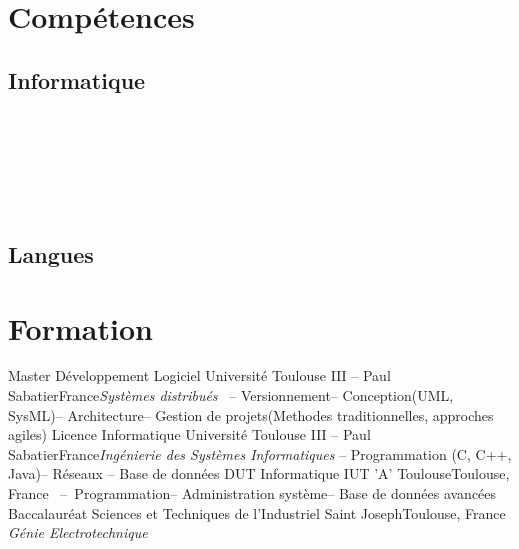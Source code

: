 \documentclass{my_cv_bis}
\begin{document}
		\section{Compétences}
			\subsection{Informatique}
			\\
			\\
			\\
			\\
			\\

		\subsection{Langues}

	\section{Formation}
	{\textnormal{Master Développement Logiciel}}
	{Université Toulouse III -- Paul Sabatier}{France}{\textit{Systèmes distribués}
	\newline~-- Versionnement\newline -- Conception(UML, SysML)\newline -- Architecture\newline -- Gestion de projets(Methodes
	traditionnelles, approches agiles)}{}
	{\textnormal{Licence Informatique}}
	{Université Toulouse III -- Paul Sabatier}{France}{\textit{Ingénierie des Systèmes Informatiques}\newline 
	-- Programmation (C, C++, Java)\newline -- Réseaux \newline -- Base de données}{}
	{\textnormal{DUT Informatique}}
	{IUT 'A' Toulouse}{Toulouse, France}
	{~--~Programmation\newline-- Administration système\newline-- Base de données avancées}
	{}
	{\textnormal{Baccalauréat Sciences et Techniques de l'Industriel}}
	{Saint Joseph}{Toulouse, France}
	{\textit{Génie Electrotechnique}}{}
\end{document}

